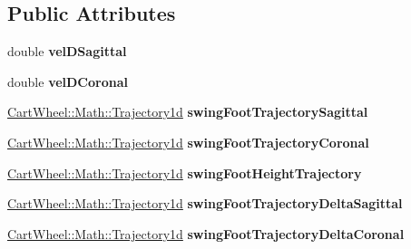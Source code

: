 \subsection*{Public Attributes}
\begin{DoxyCompactItemize}
\item 
\hypertarget{classCartWheel_1_1Core_1_1IKVMCController_a6c3af892d340cb8411da34b19ed5046f}{
double {\bfseries velDSagittal}}
\label{classCartWheel_1_1Core_1_1IKVMCController_a6c3af892d340cb8411da34b19ed5046f}

\item 
\hypertarget{classCartWheel_1_1Core_1_1IKVMCController_ab8b88b743e72154646d30daec5b9d8a7}{
double {\bfseries velDCoronal}}
\label{classCartWheel_1_1Core_1_1IKVMCController_ab8b88b743e72154646d30daec5b9d8a7}

\item 
\hypertarget{classCartWheel_1_1Core_1_1IKVMCController_a2d0ac509045d5a6249596db7f448d5d4}{
\hyperlink{classCartWheel_1_1Math_1_1GenericTrajectory}{CartWheel::Math::Trajectory1d} {\bfseries swingFootTrajectorySagittal}}
\label{classCartWheel_1_1Core_1_1IKVMCController_a2d0ac509045d5a6249596db7f448d5d4}

\item 
\hypertarget{classCartWheel_1_1Core_1_1IKVMCController_a00e781aec7d0de44574590e73ef83e82}{
\hyperlink{classCartWheel_1_1Math_1_1GenericTrajectory}{CartWheel::Math::Trajectory1d} {\bfseries swingFootTrajectoryCoronal}}
\label{classCartWheel_1_1Core_1_1IKVMCController_a00e781aec7d0de44574590e73ef83e82}

\item 
\hypertarget{classCartWheel_1_1Core_1_1IKVMCController_ab4600f782d16f9f9a47fefc662d11d94}{
\hyperlink{classCartWheel_1_1Math_1_1GenericTrajectory}{CartWheel::Math::Trajectory1d} {\bfseries swingFootHeightTrajectory}}
\label{classCartWheel_1_1Core_1_1IKVMCController_ab4600f782d16f9f9a47fefc662d11d94}

\item 
\hypertarget{classCartWheel_1_1Core_1_1IKVMCController_abf2177db029846395d29eb8bb41dad74}{
\hyperlink{classCartWheel_1_1Math_1_1GenericTrajectory}{CartWheel::Math::Trajectory1d} {\bfseries swingFootTrajectoryDeltaSagittal}}
\label{classCartWheel_1_1Core_1_1IKVMCController_abf2177db029846395d29eb8bb41dad74}

\item 
\hypertarget{classCartWheel_1_1Core_1_1IKVMCController_aea10804da9646d63e4b0d27ce077ee62}{
\hyperlink{classCartWheel_1_1Math_1_1GenericTrajectory}{CartWheel::Math::Trajectory1d} {\bfseries swingFootTrajectoryDeltaCoronal}}
\label{classCartWheel_1_1Core_1_1IKVMCController_aea10804da9646d63e4b0d27ce077ee62}


\end{DoxyCompactItemize}
